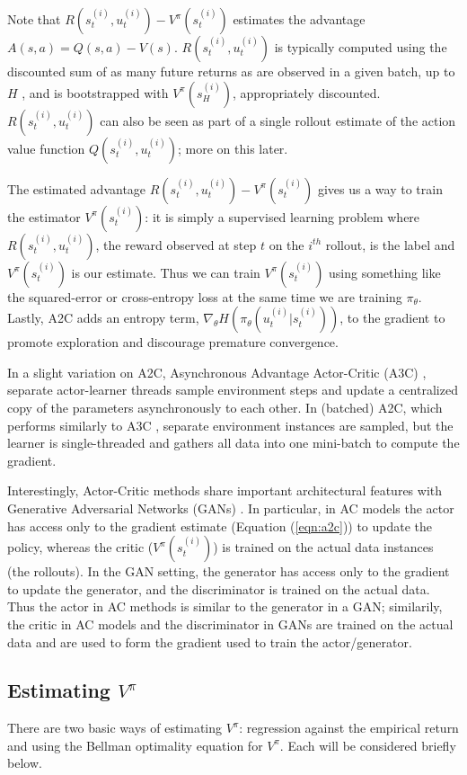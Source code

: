 \documentclass[11pt, oneside]{article}                          %
\begin{document}
\bigskip
\noindent
Note that $R(s^{(i)}_t, u^{(i)}_t) - V^{\pi}(s^{(i)}_t)$
estimates the advantage $A(s, a) = Q(s, a) - V (s)$.
$R(s^{(i)}_t, u^{(i)}_t)$ is typically computed using the
discounted sum of as many future returns as are observed in a
given batch, up to $H$ , and is bootstrapped with
$V^{\pi}(s^{(i)}_H)$, appropriately discounted. $R(s^{(i)}_t,
u^{(i)}_t)$ can also be seen as part of a single rollout estimate
of the action value function $Q(s^{(i)}_t, u^{(i)}_t)$; more on
this later.

\bigskip
\noindent
The estimated advantage $R(s^{(i)}_t, u^{(i)}_t) -
V^{\pi}(s^{(i)}_t)$ gives us a way to train the estimator
$V^{\pi}(s^{(i)}_t)$: it is simply a supervised learning problem
where $R(s^{(i)}_t, u^{(i)}_t)$, the reward observed at step $t$
on the $i^{th}$ rollout, is the label and $V^{\pi}(s^{(i)}_t)$ is
our estimate. Thus we can train $V^{\pi}(s^{(i)}_t)$ using
something like the squared-error or cross-entropy loss at the
same time we are training $\pi_{\theta}$. Lastly, A2C adds an
entropy term, $\nabla_{\theta} H(\pi_{\theta} (u^{(i)}_t |
s^{(i)}_t))$, to the gradient to promote exploration and
discourage premature convergence.

\bigskip
\noindent
In a slight variation on A2C, Asynchronous Advantage Actor-Critic
(A3C) \cite{2016arXiv160201783M}, separate actor-learner threads
sample environment steps and update a centralized copy of the
parameters asynchronously to each other. In (batched) A2C, which
performs similarly to A3C \cite{2017arXiv170706347S}, separate
environment instances are sampled, but the learner is
single-threaded and gathers all data into one mini-batch to
compute the gradient.

\bigskip
\noindent
Interestingly, Actor-Critic methods share important architectural
features with Generative Adversarial Networks (GANs)
\cite{2016arXiv160201783M}. In particular, in AC models the actor
has access only to the gradient estimate (Equation (\ref{eqn:a2c}))
to update the policy, whereas the critic ($ V^{\pi}(s^{(i)}_t)$)
is trained on the actual data instances (the rollouts).  In the
GAN setting, the generator has access only to the gradient to
update the generator, and the discriminator is trained on the
actual data. Thus the actor in AC methods is similar to the
generator in a GAN; similarily, the critic in AC models and the
discriminator in GANs are trained on the actual data and are used
to form the gradient used to train the actor/generator.

\subsection{Estimating $V^{\pi}$}
\label{seq:estimating_v}
There are two basic ways of estimating $V^{\pi}$: regression
against the empirical return and using the Bellman optimality
equation for $V^{\pi}$. Each will be considered briefly below.
\end{document}
